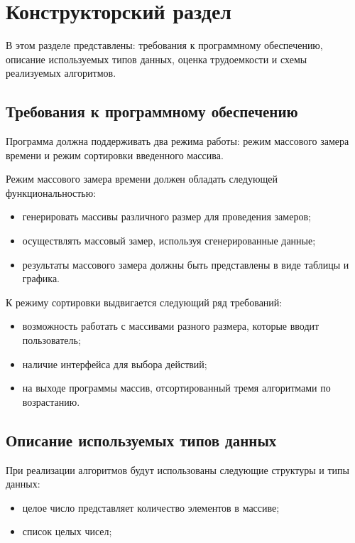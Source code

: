 \chapter{Конструкторский раздел}

В этом разделе представлены: требования к программному обеспечению, описание используемых типов данных, оценка трудоемкости и схемы реализуемых алгоритмов.


\section{Требования к программному обеспечению}


Программа должна поддерживать два режима работы: режим массового замера времени и режим сортировки введенного массива.

Режим массового замера времени должен обладать следующей функциональностью:
\begin{itemize}
	\item генерировать массивы различного размер для проведения замеров;
	\item осуществлять массовый замер, используя сгенерированные данные;
	\item результаты массового замера должны быть представлены в виде таблицы и графика.
\end{itemize}

К режиму сортировки выдвигается следующий ряд требований:
\begin{itemize}
	\item возможность работать с массивами разного размера, которые вводит пользователь;
	\item наличие интерфейса для выбора действий;
	\item на выходе программы массив, отсортированный тремя алгоритмами по возрастанию.
\end{itemize}

\section{Описание используемых типов данных}

При реализации алгоритмов будут использованы следующие структуры и типы данных:
\begin{itemize}
	\item целое число представляет количество элементов в массиве;
	\item список целых чисел;
\end{itemize}

